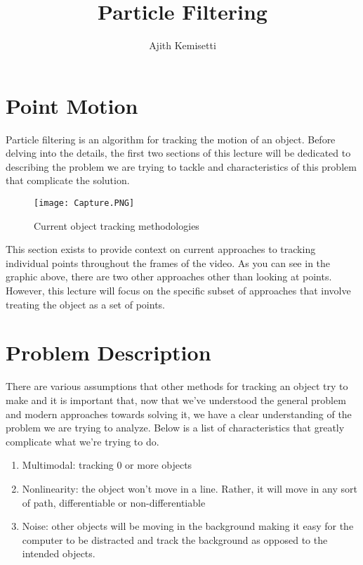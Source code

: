 \documentclass{llncs}
\begin{document}
\title{Particle Filtering}
%
\author{Ajith Kemisetti\inst{}}
%


\maketitle              %

%



\section{Point Motion}
Particle filtering is an algorithm for tracking the motion of an object. Before delving into the details, the first two sections of this lecture will be dedicated to describing the problem we are trying to tackle and characteristics of this problem that complicate the solution.  
\newline
\begin{wrapfigure}{}{}
  \begin{center}
    \texttt{[image: Capture.PNG]}
  \end{center}
  \caption{Current object tracking methodologies}
\end{wrapfigure}
\newline
\newline
\indent This section exists to provide context on current approaches to tracking individual points throughout the frames of the video. As you can see in the graphic above, there are two other approaches other than looking at points. However, this lecture will focus on the specific subset of approaches that involve treating the object as a set of points. \pagebreak
\section{Problem Description}
There are various assumptions that other methods for tracking an object try to make and it is important that, now that we've understood the general problem and modern approaches towards solving it, we have a clear understanding of the problem we are trying to analyze. Below is a list of characteristics that greatly complicate what we're trying to do.
\begin{enumerate}\bfseries
\item Multimodal: tracking 0 or more objects
\item Nonlinearity: the object won't move in a line. Rather, it will move in any sort of path, differentiable or non-differentiable
\item Noise: other objects will be moving in the background making it easy for the computer to be distracted and track the background as opposed to the intended objects.
\end{enumerate}
\end{document}
